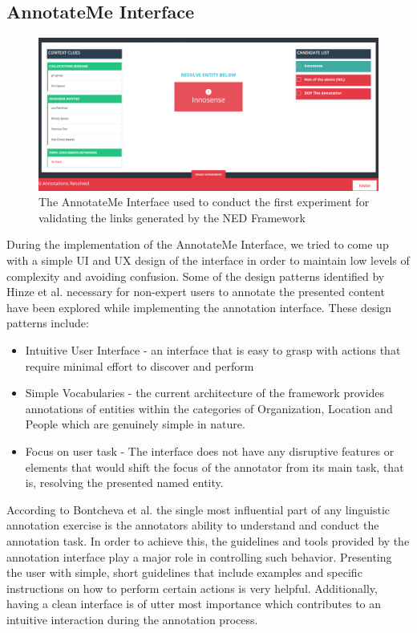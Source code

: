 \subsection{AnnotateMe Interface}

\begin{figure}[]
  \includegraphics[width=\linewidth]{figures/annotateme-interface.png}
  \caption{The AnnotateMe Interface used to conduct the first experiment for validating the links generated by the NED Framework}
  \label{fig:annotateme-interface}
\end{figure}

During the implementation of the AnnotateMe Interface, we tried to come up with a simple UI and UX design of the interface in order to maintain low levels of complexity and avoiding confusion. Some of the design patterns identified by Hinze et al. \cite{15} necessary for non-expert users to annotate the presented content have been explored while implementing the annotation interface. These design patterns include:
\begin{itemize}
    \item Intuitive User Interface - an interface that is easy to grasp with actions that require minimal effort to discover and perform
    \item Simple Vocabularies - the current architecture of the framework provides annotations of entities within the categories of Organization, Location and People which are genuinely simple in nature.
    \item Focus on user task - The interface does not have any disruptive features or elements that would shift the focus of the annotator from its main task, that is, resolving the presented named entity.
\end{itemize}

According to Bontcheva et al. \cite{33} the single most influential part of any linguistic annotation exercise is the annotators ability to understand and conduct the annotation task. In order to achieve this, the guidelines and tools provided by the annotation interface play a major role in controlling such behavior. Presenting the user with simple, short guidelines that include examples and specific instructions on how to perform certain actions is very helpful. Additionally, having a clean interface is of utter most importance which contributes to an intuitive interaction during the annotation process. \cite{33} 

